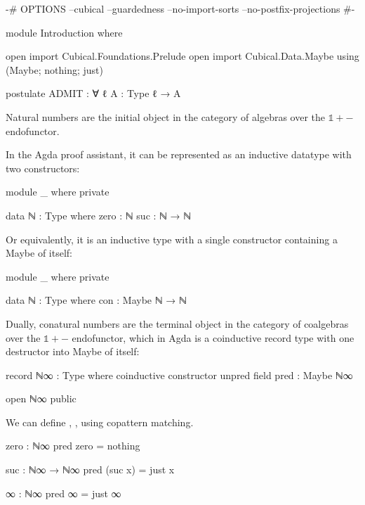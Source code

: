 \begin{code}[hide]
{-# OPTIONS --cubical --guardedness --no-import-sorts --no-postfix-projections #-}

module Introduction where

open import Cubical.Foundations.Prelude
open import Cubical.Data.Maybe using (Maybe; nothing; just)

postulate
  ADMIT : ∀ {ℓ} {A : Type ℓ} → A
\end{code}

Natural numbers are the initial object in the category of algebras
over the $\mathbb{1} + {-}$ endofunctor.

In the Agda proof assistant, it can be represented as an inductive
datatype with two constructors:

\begin{code}[hide]
module _ where private
\end{code}
\begin{code}
  data ℕ : Type where
    zero  : ℕ
    suc   : ℕ → ℕ
\end{code}

Or equivalently, it is an inductive type with a single constructor
containing a Maybe of itself:

\begin{code}[hide]
module _ where private
\end{code}
\begin{code}
  data ℕ : Type where
    con : Maybe ℕ → ℕ
\end{code}

Dually, conatural numbers are the terminal object in the category of
coalgebras over the $\mathbb{1} + {-}$ endofunctor, which in Agda is a
coinductive record type with one destructor into Maybe of itself:

\begin{code}
record ℕ∞ : Type where
  coinductive
  constructor unpred
  field
    pred : Maybe ℕ∞
\end{code}
\begin{code}[hide]
open ℕ∞ public
\end{code}

We can define , ,  using copattern matching.

\begin{code}
zero : ℕ∞
pred zero = nothing

suc : ℕ∞ → ℕ∞
pred (suc x) = just x

∞ : ℕ∞
pred ∞ = just ∞
\end{code}


